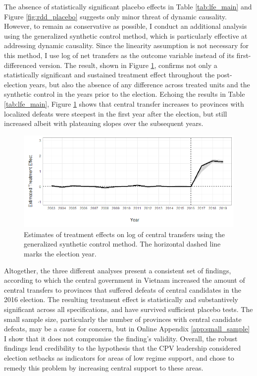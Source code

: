 \documentclass[12pt]{article}
\newcommand{\1}{\mathbbm{1}}
\begin{document}
The absence of statistically significant placebo effects in Table \ref{tab:lfe_main} and Figure \ref{fig:rdd_placebo} suggests only minor threat of dynamic causality. However, to remain as conservative as possible, I conduct an additional analysis using the generalized synthetic control method, which is particularly effective at addressing dynamic causality. Since the linearity assumption is not necessary for this method, I use log of net transfers as the outcome variable instead of its first-differenced version. The result, shown in Figure \ref{fig:synth_placebo}, confirms not only a statistically significant and sustained treatment effect throughout the post-election years, but also the absence of any difference across treated units and the synthetic control in the years prior to the election. Echoing the results in Table \ref{tab:lfe_main}, Figure \ref{fig:synth_placebo} shows that central transfer increases to provinces with localized defeats were steepest in the first year after the election, but still increased albeit with plateauing slopes over the subsequent years.

\begin{figure}[!htbp]
	\centering
	\includegraphics[width=\textwidth]{figure/200916_synth_results.png}
	\captionsetup{singlelinecheck=off}
	\caption[Estimated synthetic control treatment effects]{Estimates of treatment effects on log of central transfers using the generalized synthetic control method. The horizontal dashed line marks the election year.}
	\label{fig:synth_placebo}
\end{figure}

Altogether, the three different analyses present a consistent set of findings, according to which the central government in Vietnam increased the amount of central transfers to provinces that suffered defeats of central candidates in the 2016 election. The resulting treatment effect is statistically and substantively significant across all specifications, and have survived sufficient placebo tests. The small sample size, particularly the number of provinces with central candidate defeats, may be a cause for concern, but in Online Appendix \ref{app:small_sample} I show that it does not compromise the finding's validity. Overall, the robust findings lend credibility to the hypothesis that the CPV leadership considered election setbacks as indicators for areas of low regime support, and chose to remedy this problem by increasing central support to these areas.
\end{document}
